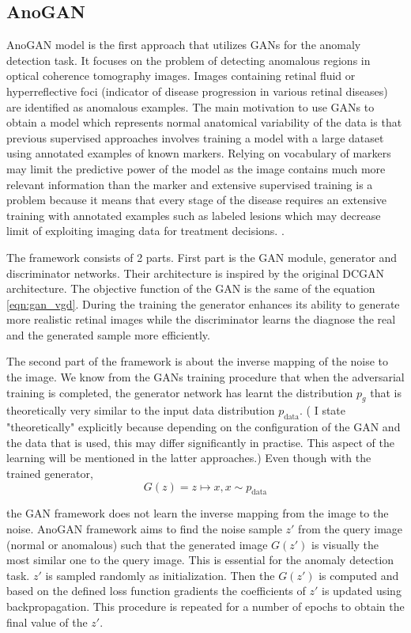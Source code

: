 \subsection{AnoGAN}

AnoGAN model is the first approach that utilizes GANs for the anomaly detection task.
\cite{Schlegl2017UnsupervisedAD} It focuses on the problem of detecting anomalous regions in optical
coherence tomography images. Images containing retinal fluid or hyperreflective foci (indicator of
disease progression in various retinal diseases) are identified as anomalous examples. The main
motivation to use GANs to obtain a model which represents normal anatomical variability of the data
is that previous supervised approaches involves training a model with a large dataset using
annotated examples of known markers. Relying on vocabulary of markers may limit the predictive power
of the model as the image contains much more relevant information than the marker and extensive
supervised training is a problem because it means that every stage of the disease requires an
extensive training with annotated examples such as labeled lesions which may decrease limit of
exploiting imaging data for treatment decisions. \cite{Schlegl2017UnsupervisedAD}.

The framework consists of 2 parts. First part is the GAN module, generator and discriminator
networks. Their architecture is inspired by the original DCGAN
architecture\cite{Radford2016UnsupervisedRL}. The objective function of the GAN is the same of the
equation \ref{eqn:gan_vgd}. During the training the generator enhances its ability to generate more realistic
retinal images while the discriminator learns the diagnose the real and the generated sample more
efficiently. 

The second part of the framework is about the inverse mapping of the noise to the image. We know
from the GANs training procedure that when the adversarial training is completed, the generator
network has learnt the distribution $p_g$ that is theoretically very similar to the input data
distribution $p_{\text{data}}$. ( I state "theoretically" explicitly because depending on the
configuration of the GAN and the data that is used, this may differ significantly in practise. This
aspect of the learning will be mentioned in the latter approaches.) Even though with the trained
generator, 
$$
G(z) = z \mapsto x,x \sim p_{\text{data}}
$$

the GAN framework does not learn the inverse mapping from the image to the noise. AnoGAN framework
aims to find the noise sample $z\prime$ from the query image (normal or anomalous) such that the
generated image $G(z\prime)$ is visually the most similar one to the query image. This is essential
for the anomaly detection task. $z\prime$ is sampled randomly as initialization. Then the
$G(z\prime)$ is computed and based on the defined loss function gradients the coefficients of
$z\prime$ is updated using backpropagation. This procedure is repeated for a number of epochs to
obtain the final value of the $z\prime$. 

